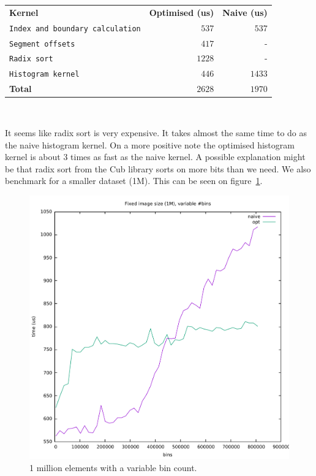 \documentclass[12pt, a4paper, hidelinks]{article}
\def\fatline{\Xhline{2\arrayrulewidth}}
\renewcommand{\tt}[1]{\texttt{#1}}
\renewcommand{\bf}[1]{\textbf{#1}}
\begin{document}
\begin{table}
    \begin{center}
        \begin{tabular}{l|r|r}
            \bf{Kernel} & \bf{Optimised (us)} & \bf{Naive (us)}   \\ \fatline
            \tt{Index and boundary calculation} & $537$  & $537$  \\ \hline
            \tt{Segment offsets}                & $417$  & -      \\ \hline
            \tt{Radix sort}                     & $1228$ & -      \\ \hline
            \tt{Histogram kernel}               & $446$  & $1433$ \\ \fatline
            \bf{Total}                          & $2628$ & $1970$ \\
        \end{tabular}\\
        \label{table:nvprof0}
    \end{center}
\end{table}

It seems like radix sort is very expensive.
It takes almost the same time to do as the naive histogram kernel.
On a more positive note the optimised histogram kernel is about 3 times as
fast as the naive kernel. A possible explanation might be that radix sort
from the Cub library sorts on more bits than we need. We also benchmark
for a smaller dataset (1M). This can be seen on figure~\ref{fig:graph2}.

\begin{figure}[htpb]
    \centering
    \includegraphics[width=0.6\linewidth]{img/graphs/1M-varbins.pdf}
    \caption{1 million elements with a variable bin count.}
    \label{fig:graph2}
\end{figure}
\end{document}
